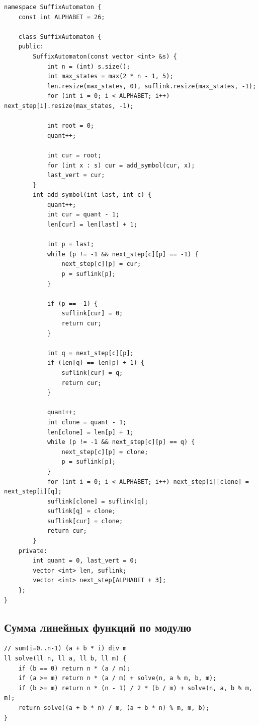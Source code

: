 \documentclass[10pt, portrait,letterpaper]{article}
\begin{document}
\begin{verbatim}
namespace SuffixAutomaton {
    const int ALPHABET = 26;
    
    class SuffixAutomaton {
    public:
        SuffixAutomaton(const vector <int> &s) {
            int n = (int) s.size();
            int max_states = max(2 * n - 1, 5);
            len.resize(max_states, 0), suflink.resize(max_states, -1);
            for (int i = 0; i < ALPHABET; i++) next_step[i].resize(max_states, -1);

            int root = 0; 
            quant++;

            int cur = root;
            for (int x : s) cur = add_symbol(cur, x);	
            last_vert = cur;
        }
        int add_symbol(int last, int c) {
            quant++;
            int cur = quant - 1;
            len[cur] = len[last] + 1;

            int p = last;
            while (p != -1 && next_step[c][p] == -1) {
                next_step[c][p] = cur;
                p = suflink[p];
            }

            if (p == -1) {
                suflink[cur] = 0;
                return cur; 	
            }

            int q = next_step[c][p];
            if (len[q] == len[p] + 1) {
                suflink[cur] = q;
                return cur;
            }

            quant++;
            int clone = quant - 1;
            len[clone] = len[p] + 1;
            while (p != -1 && next_step[c][p] == q) {
                next_step[c][p] = clone;
                p = suflink[p];
            }
            for (int i = 0; i < ALPHABET; i++) next_step[i][clone] = next_step[i][q];
            suflink[clone] = suflink[q];
            suflink[q] = clone;
            suflink[cur] = clone;
            return cur;
        }
    private:
        int quant = 0, last_vert = 0;
        vector <int> len, suflink;
        vector <int> next_step[ALPHABET + 3];
    };
}
\end{verbatim}

\subsection{Сумма линейных функций по модулю}
\begin{verbatim}
// sum(i=0..n-1) (a + b * i) div m
ll solve(ll n, ll a, ll b, ll m) {
    if (b == 0) return n * (a / m);
    if (a >= m) return n * (a / m) + solve(n, a % m, b, m);
    if (b >= m) return n * (n - 1) / 2 * (b / m) + solve(n, a, b % m, m);
    return solve((a + b * n) / m, (a + b * n) % m, m, b);
}
\end{verbatim}
\end{document}
